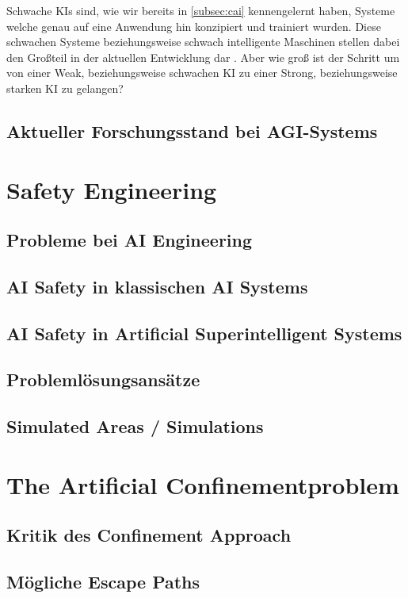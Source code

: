     Schwache KIs sind, wie wir bereits in \ref{subsec:cai} kennengelernt haben, Systeme welche genau auf
    eine Anwendung hin konzipiert und trainiert wurden. Diese schwachen Systeme beziehungsweise schwach
    intelligente Maschinen stellen dabei den Großteil in der aktuellen Entwicklung dar \cite{brendel_2019}.
    Aber wie groß ist der Schritt um von einer Weak, beziehungsweise schwachen KI zu einer Strong,
    beziehungsweise starken KI zu gelangen?


    \subsection{Aktueller Forschungsstand bei AGI-Systems}
    
\section{Safety Engineering}
    \subsection{Probleme bei AI Engineering}
    \subsection{AI Safety in klassischen AI Systems}
    \subsection{AI Safety in Artificial Superintelligent Systems}

    \subsection{Problemlösungsansätze} 
    \subsection{Simulated Areas / Simulations}
\section{The Artificial Confinementproblem}
    \subsection{Kritik des Confinement Approach}
    \subsection{Mögliche Escape Paths}
